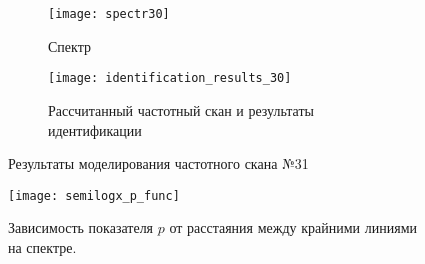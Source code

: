 	\begin{figure}[h!]
		\centering
		\begin{subfigure}[c]{0.3\textwidth}
			\texttt{[image: spectr30]}
			\caption{Спектр}
			\label{pic:results_2_spectr}
		\end{subfigure}
		\begin{subfigure}[c]{0.45\textwidth}
			\texttt{[image: identification\_results\_30]}
			\caption{Рассчитанный частотный скан и результаты идентификации}
			\label{pic:results_2_scan}
		\end{subfigure}
		\caption{Результаты моделирования частотного скана №31}
		\label{pic:result_2}
	\end{figure}

	\begin{figure}[h!]
		\centering
		\texttt{[image: semilogx\_p\_func]}
		\caption{Зависимость показателя $p$ от расстаяния между крайними
		линиями на спектре.}
		\label{pic:p_delta_tau}
	\end{figure}
